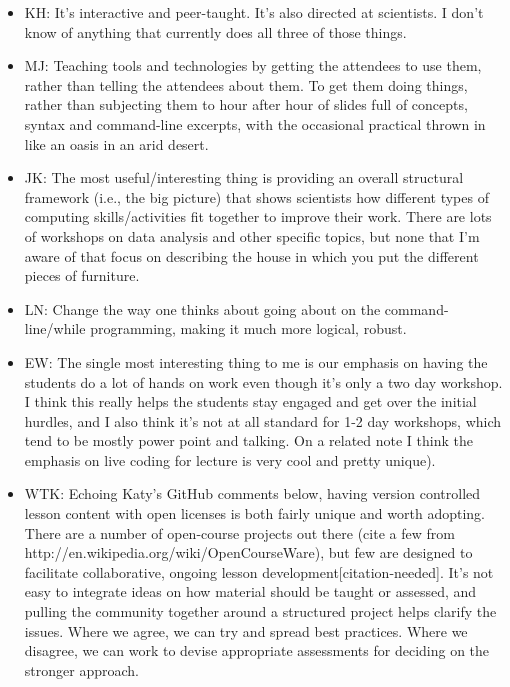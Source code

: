 \documentclass{article}
\begin{document}
\begin{itemize}

  \item KH: It's interactive and peer-taught. It's also directed at scientists. I don't know of anything that currently does all three of those things.

  \item MJ: Teaching tools and technologies by getting the attendees to use them, rather than telling the attendees about them. To get them doing things, rather than subjecting them to hour after hour of slides full of concepts, syntax and command-line excerpts, with the occasional practical thrown in like an oasis in an arid desert.

  \item JK: The most useful/interesting thing is providing an overall structural framework (i.e., the big picture) that shows scientists how different types of computing skills/activities fit together to improve their work. There are lots of workshops on data analysis and other specific topics, but none that I'm aware of that focus on describing the house in which you put the different pieces of furniture.

  \item LN: Change the way one thinks about going about on the command-line/while programming, making it much more logical, robust.

  \item EW: The single most interesting thing to me is our emphasis on having the students do a lot of hands on work even though it's only a two day workshop. I think this really helps the students stay engaged and get over the initial hurdles, and I also think it's not at all standard for 1-2 day workshops, which tend to be mostly power point and talking. On a related note I think the emphasis on live coding for lecture is very cool and pretty unique).

  \item WTK: Echoing Katy's GitHub comments below, having version controlled lesson content with open licenses is both fairly unique and worth adopting.  There are a number of open-course projects out there (cite a few from http://en.wikipedia.org/wiki/OpenCourseWare), but few are designed to facilitate collaborative, ongoing lesson development[citation-needed].  It's not easy to integrate ideas on how material should be taught or assessed, and pulling the community together around a structured project helps clarify the issues.  Where we agree, we can try and spread best practices.  Where we disagree, we can work to devise appropriate assessments for deciding on the stronger approach.

\end{itemize}
\end{document}
